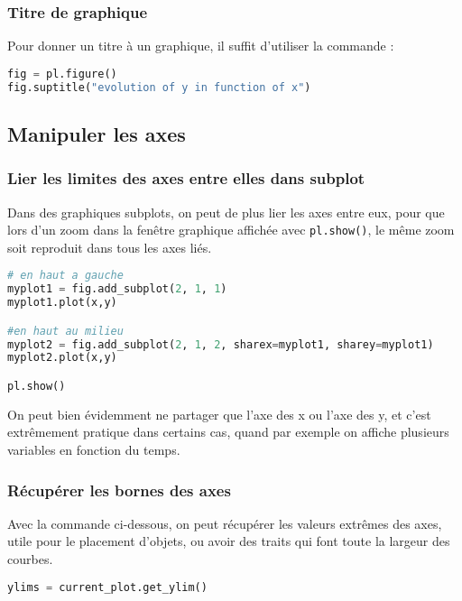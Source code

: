 \documentclass[a4paper,twoside]{article}
\begin{document}
\subsubsection{Titre de graphique}
Pour donner un titre à un graphique, il suffit d'utiliser la commande : 
\begin{lstlisting}[language=python]
fig = pl.figure()
fig.suptitle("evolution of y in function of x")
\end{lstlisting}

\subsection{Manipuler les axes}

\subsubsection{Lier les limites des axes entre elles dans subplot}
Dans des graphiques subplots, on peut de plus lier les axes entre eux, pour que lors d'un zoom dans la fenêtre graphique affichée avec \texttt{pl.show()}, le même zoom soit reproduit dans tous les axes liés.

\begin{lstlisting}[language=python]
# en haut a gauche
myplot1 = fig.add_subplot(2, 1, 1)
myplot1.plot(x,y)

#en haut au milieu
myplot2 = fig.add_subplot(2, 1, 2, sharex=myplot1, sharey=myplot1)
myplot2.plot(x,y)

pl.show()
\end{lstlisting}

\begin{remarque}
On peut bien évidemment ne partager que l'axe des x ou l'axe des y, et c'est extrêmement pratique dans certains cas, quand par exemple on affiche plusieurs variables en fonction du temps.
\end{remarque}

\subsubsection{Récupérer les bornes des axes}
Avec la commande ci-dessous, on peut récupérer les valeurs extrêmes des axes, utile pour le placement d'objets, ou avoir des traits qui font toute la largeur des courbes.
\begin{lstlisting}[language=python]
ylims = current_plot.get_ylim()
\end{lstlisting}
\end{document}
